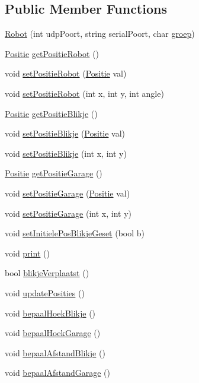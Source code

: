 \subsection*{Public Member Functions}
\begin{DoxyCompactItemize}
\item 
\hyperlink{classRobot_aa269489a0691f410fb286301be6d2434}{Robot} (int udp\-Poort, string serial\-Poort, char \hyperlink{classServer_ae63c2574fcde32ea16b06b0bcb61b716}{groep})
\item 
\hyperlink{classPositie}{Positie} \hyperlink{classRobot_a43fdd19ef403be762d659593023dda8a}{get\-Positie\-Robot} ()
\item 
void \hyperlink{classRobot_a6d3de1bc1f766693e4058a02a7744293}{set\-Positie\-Robot} (\hyperlink{classPositie}{Positie} val)
\item 
void \hyperlink{classRobot_a3f35253e8b6e3810aa377c9f3c4158de}{set\-Positie\-Robot} (int x, int y, int angle)
\item 
\hyperlink{classPositie}{Positie} \hyperlink{classRobot_abfab62ce2a3ff22f237e34ad1a6650e7}{get\-Positie\-Blikje} ()
\item 
void \hyperlink{classRobot_ad1c9b6e11cfb97e966350162ef38c7a2}{set\-Positie\-Blikje} (\hyperlink{classPositie}{Positie} val)
\item 
void \hyperlink{classRobot_a29185fbf1e17fe20b357afb1753bb29e}{set\-Positie\-Blikje} (int x, int y)
\item 
\hyperlink{classPositie}{Positie} \hyperlink{classRobot_a9301d035810174edffb769fd097f2a0c}{get\-Positie\-Garage} ()
\item 
void \hyperlink{classRobot_affb796dc23ca48799c1fc9ab31f578d9}{set\-Positie\-Garage} (\hyperlink{classPositie}{Positie} val)
\item 
void \hyperlink{classRobot_a371cff32d467a1cbaf2a8d212921845a}{set\-Positie\-Garage} (int x, int y)
\item 
void \hyperlink{classRobot_a17c05db895bbe8696acb2e0079f68de0}{set\-Initiele\-Pos\-Blikje\-Geset} (bool b)
\item 
void \hyperlink{classRobot_a4895306b538817f9044c1b9b69e89781}{print} ()
\item 
bool \hyperlink{classRobot_ab6fc311f9a66f524aac0757a7b2a4a57}{blikje\-Verplaatst} ()
\item 
void \hyperlink{classRobot_a980d1f972db40e5afcf3e2caf6ba346c}{update\-Posities} ()
\item 
void \hyperlink{classRobot_a1cbfcc8e3580c8ac369dc696dbdd640c}{bepaal\-Hoek\-Blikje} ()
\item 
void \hyperlink{classRobot_a5b40bae7bd0b458676caf2f5288d2047}{bepaal\-Hoek\-Garage} ()
\item 
void \hyperlink{classRobot_a80ce23f76438783761968602b801a401}{bepaal\-Afstand\-Blikje} ()
\item 
void \hyperlink{classRobot_a212f7383710351d161f084720aac00ad}{bepaal\-Afstand\-Garage} ()
\end{DoxyCompactItemize}
